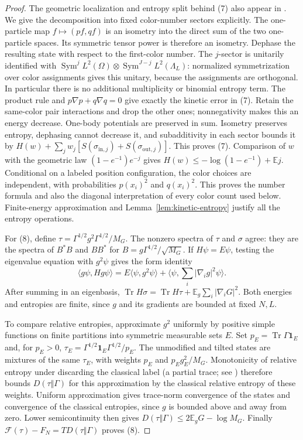 \begin{proof}
The geometric localization and entropy split behind (7) also appear in
\cite[Section~3, Lemma~3.1]{DeuchertSeiringerYngvason2019}.
We give the decomposition into fixed color-number sectors explicitly.
The one-particle map $f\mapsto(pf,qf)$ is an isometry into the direct
sum of the two one-particle spaces. Its symmetric tensor power is
therefore an isometry. Dephase the resulting state with respect to
the first-color number. The $j$-sector is unitarily identified with
$\operatorname{Sym}^jL^2(\Omega)\otimes
\operatorname{Sym}^{J-j}L^2(\Lambda_L)$: normalized symmetrization
over color assignments gives this unitary, because the assignments
are orthogonal. In particular there is no additional multiplicity
or binomial entropy term. The product rule and
$p\nabla p+q\nabla q=0$ give exactly the kinetic error in (7).
Retain the same-color pair interactions and drop the other ones;
nonnegativity makes this an energy decrease. One-body potentials
are preserved in sum. Isometry preserves entropy, dephasing cannot
decrease it, and subadditivity in each sector bounds it by
$H(w)+\sum_jw_j[S(\sigma_{\mathrm{in},j})+
S(\sigma_{\mathrm{out},j})]$. This proves (7).
Comparison of $w$ with the geometric law
$(1-e^{-1})e^{-j}$ gives $H(w)\leq-\log(1-e^{-1})+\mathbb E j$.
Conditional on a labeled position configuration, the color choices
are independent, with probabilities $p(x_i)^2$ and $q(x_i)^2$.
This proves the number formula and also the diagonal interpretation
of every color count used below. Finite-energy approximation and
Lemma~\ref{lem:kinetic-entropy} justify all the entropy operations.

For (8), define
$\tau=\Gamma^{1/2}g^2\Gamma^{1/2}/M_G$.
The nonzero spectra of $\tau$ and $\sigma$ agree: they are the
spectra of $B^*B$ and $BB^*$ for $B=g\Gamma^{1/2}/\sqrt{M_G}$.
If $H\psi=E\psi$, testing the eigenvalue equation with $g^2\psi$
gives the form identity
\[
 \langle g\psi,Hg\psi\rangle
 =E\langle\psi,g^2\psi\rangle+
 \langle\psi,\sum_i|\nabla_i g|^2\psi\rangle.
\]
After summing in an eigenbasis,
$\operatorname{Tr}H\sigma=\operatorname{Tr}H\tau+
\mathbb E_g\sum_i|\nabla_iG|^2$. Both energies and entropies are
finite, since $g$ and its gradients are bounded at fixed $N,L$.

To compare relative entropies, approximate $g^2$ uniformly by positive
simple functions on finite partitions into symmetric measurable
sets $E$. Set $p_E=\operatorname{Tr}\Gamma\mathbf1_E$ and, for
$p_E>0$, $\tau_E=\Gamma^{1/2}\mathbf1_E\Gamma^{1/2}/p_E$.
The unmodified and tilted states are mixtures of the same $\tau_E$,
with weights $p_E$ and $p_Eg_E^2/M_G$. Monotonicity of relative
entropy under discarding the classical label (a partial trace;
see \cite[Corollary~(3.2) and Section~IV]{LiebRuskai1973Entropy}) therefore bounds
$D(\tau\Vert\Gamma)$ for this approximation by the classical
relative entropy of these weights. Uniform approximation gives
trace-norm convergence of the states and convergence of the
classical entropies, since $g$ is bounded above and away from zero.
Lower semicontinuity then gives
$D(\tau\Vert\Gamma)\leq2\mathbb E_gG-\log M_G$.
Finally $\mathcal F(\tau)-F_N=TD(\tau\Vert\Gamma)$ proves (8).
\end{proof}

